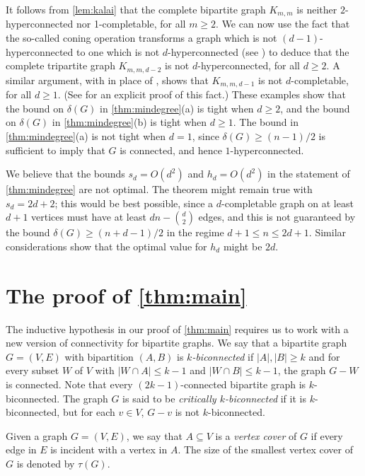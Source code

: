 \documentclass[11pt,a4paper,dvipsnames]{scrartcl}
\newcommand{\locallycompletable}[1]{$d$-completable}
\begin{document}
\medskip

It follows from \cref{lem:kalai} that the complete bipartite graph $K_{m,m}$ is neither $2$-hyperconnected nor 1-completable, for all $m\geq 2$. We can now use the fact that the so-called coning operation transforms a graph which is not $(d-1)$-hyperconnected to one which is not $d$-hyperconnected (see \cite[Theorem 5.1]{K}) to deduce that the complete tripartite graph  $K_{m,m,d-2}$ is not $d$-hyperconnected, for all $d\geq 2$. A similar argument, with \cite[Lemma 6]{JJT2} in place of \cite[Theorem 5.1]{K}, shows that $K_{m,m,d-1}$ is not  \locallycompletable{d}, for all $d\geq 1$. (See \cite[Lemma 9]{JJT2} for an explicit proof of this fact.) 
These examples show that the bound on $\delta(G)$ in \cref{thm:mindegree}(a) is tight when $d\geq 2$, and the bound on $\delta(G)$ in \cref{thm:mindegree}(b) is tight when $d\geq 1$. The bound in \cref{thm:mindegree}(a) is not tight when $d=1$, since $\delta(G)\geq (n-1)/2$ is sufficient to imply that $G$ is connected, and hence $1$-hyperconnected. 

We believe that the bounds $s_d=O(d^2)$ and $h_d=O(d^2)$ in the statement of \cref{thm:mindegree} are not optimal.
The theorem might remain true with $s_d=2d+2$; this would be best possible, since a $d$-completable graph on at least $d+1$ vertices must have at least $dn - \binom{d}{2}$ edges, and this is not guaranteed by the bound $\delta(G) \geq (n+d-1)/2$ in the regime $d+1 \leq n \leq 2d+1$. Similar considerations show that the optimal value for $h_d$ might be $2d$.

\section{The proof of \texorpdfstring{\cref{thm:main}}{Theorem 1.3}}

The inductive hypothesis in our proof of \cref{thm:main} requires us to work with a new 
version of connectivity for bipartite graphs. 
We say that a bipartite graph $G=(V,E)$
with bipartition $(A,B)$ 
is \emph{$k$-biconnected} if $|A|,|B|\geq k$ and for every subset $W$ of $V$ with $|W\cap A|\leq k-1$ and $|W\cap B|\leq k-1$, the graph $G-W$ is connected. Note that every $(2k-1)$-connected bipartite graph is $k$-biconnected. The graph $G$ is said to be \emph{critically $k$-biconnected} if it is $k$-biconnected, but for each $v\in V$, $G-v$ is not $k$-biconnected.

Given a graph $G=(V,E)$, we say that $A \subseteq V$ is a \emph{vertex cover} of 
{$G$ if every edge in $E$ is incident with a vertex in $A$.}
The size of the smallest vertex cover of $G$ is denoted by $\tau (G)$.
   
\end{document}
